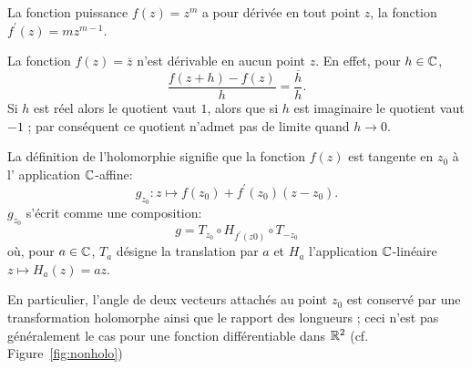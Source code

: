 \begin{exem}
La fonction puissance $f(z)=z^m$ a pour dérivée en tout point $z$, la fonction $f^\prime (z)=m z^{m-1}$. \end{exem}
\begin{exem}
 La fonction $f(z)=\overline{z}$ n'est dérivable en aucun point $z$. En effet, pour $h \in \mathbb{C}$,
\[\frac{f(z + h) - f(z)}{h}= \frac{\overline{h}}{h}.\]
Si $h$ est réel alors le quotient vaut $1$, alors que si $h$ est imaginaire le quotient vaut $-1$ ; par conséquent ce quotient n'admet pas de limite quand $h \rightarrow 0$. 
\end{exem}

La définition de l'holomorphie signifie que la fonction $f(z)$ est tangente en $z_0$ à l' application $\mathbb{C}$-affine:
\begin{equation}
  \label{eq:app_c_tangente}
  g_{z_0} \colon z \mapsto f(z_0) + f^\prime(z_0)(z-z_0).
\end{equation} 
$g_{z_0}$ s'écrit comme une composition:
\begin{equation}
  g = T_{z_0}\circ H_{f^\prime(z0)} \circ T_{-z_0}
\end{equation} 
où, pour $a \in \mathbb{C}$,  $T_a$ désigne la translation par $a$ et $H_a$ l'application $\mathbb{C}$-linéaire $z \mapsto H_a(z) = az.$


En particulier, l'angle de deux vecteurs attachés au point $z_0$ est conservé par une transformation holomorphe ainsi que le rapport
 des longueurs ; ceci n'est pas généralement le cas pour une fonction différentiable dans $\mathbb R^2$ (cf. Figure~\ref{fig:nonholo})

